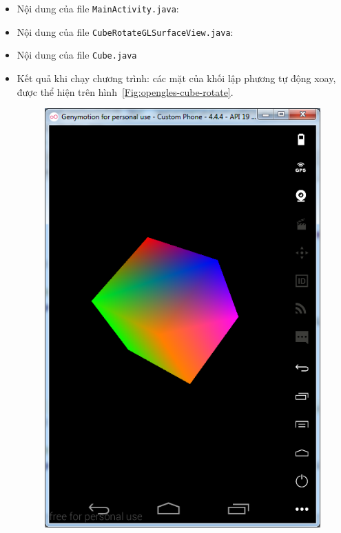 \documentclass[13pt,a4paper]{extreport}
\begin{document}
\begin{enumerate}[{\it a.}]
\begin{itemize}
						\item Nội dung của file \verb|MainActivity.java|:
							
		
						\item Nội dung của file \verb|CubeRotateGLSurfaceView.java|:
							
							
						\item Nội dung của file \verb|Cube.java|
							
					\end{itemize}
					
		\newpage			
		\begin{itemize}
			\item Kết quả khi chạy chương trình: các mặt của khối lập phương tự động xoay, được thể hiện trên hình~\ref{Fig:opengles-cube-rotate}.
				\begin{figure}[!h]
					\begin{center}
						\includegraphics[scale=.6]{opengles-cube-3.png}

\end{center}
\end{figure}
\end{itemize}
\end{enumerate}
\end{document}
